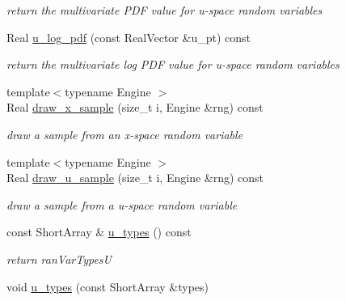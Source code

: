 \begin{DoxyCompactItemize}
\begin{DoxyCompactList}\small\item\em return the multivariate P\+DF value for u-\/space random variables \end{DoxyCompactList}\item 
Real \hyperlink{classPecos_1_1ProbabilityTransformation_a6340168f760bfde7df6a8b4e0f7952e1}{u\+\_\+log\+\_\+pdf} (const Real\+Vector \&u\+\_\+pt) const \label{classPecos_1_1ProbabilityTransformation_a6340168f760bfde7df6a8b4e0f7952e1}

\begin{DoxyCompactList}\small\item\em return the multivariate log P\+DF value for u-\/space random variables \end{DoxyCompactList}\item 
{\footnotesize template$<$typename Engine $>$ }\\Real \hyperlink{classPecos_1_1ProbabilityTransformation_abb8f8afdd3a802291aaba655ae2f64be}{draw\+\_\+x\+\_\+sample} (size\+\_\+t i, Engine \&rng) const \label{classPecos_1_1ProbabilityTransformation_abb8f8afdd3a802291aaba655ae2f64be}

\begin{DoxyCompactList}\small\item\em draw a sample from an x-\/space random variable \end{DoxyCompactList}\item 
{\footnotesize template$<$typename Engine $>$ }\\Real \hyperlink{classPecos_1_1ProbabilityTransformation_a51de17a71298ca1e481cb6612f7aafe2}{draw\+\_\+u\+\_\+sample} (size\+\_\+t i, Engine \&rng) const \label{classPecos_1_1ProbabilityTransformation_a51de17a71298ca1e481cb6612f7aafe2}

\begin{DoxyCompactList}\small\item\em draw a sample from a u-\/space random variable \end{DoxyCompactList}\item 
const Short\+Array \& \hyperlink{classPecos_1_1ProbabilityTransformation_a287eedacfbb64c6d3271ab71913a27e5}{u\+\_\+types} () const \label{classPecos_1_1ProbabilityTransformation_a287eedacfbb64c6d3271ab71913a27e5}

\begin{DoxyCompactList}\small\item\em return ran\+Var\+TypesU \end{DoxyCompactList}\item 
void \hyperlink{classPecos_1_1ProbabilityTransformation_a90b6e4a849636850f524b3bc99745110}{u\+\_\+types} (const Short\+Array \&types)\label{classPecos_1_1ProbabilityTransformation_a90b6e4a849636850f524b3bc99745110}


\end{DoxyCompactItemize}
